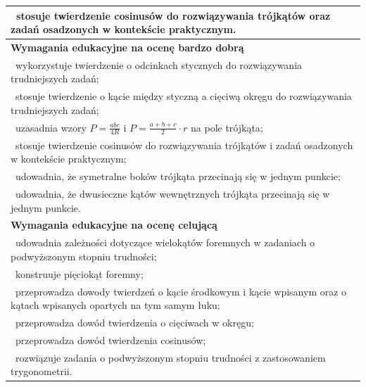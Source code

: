 \documentclass[12pt,a4paper]{article}
\begin{document}
\begin{longtable}{|p{16cm}|}
		\textbullet\ stosuje twierdzenie cosinusów do rozwiązywania trójkątów oraz zadań osadzonych w kontekście praktycznym. \\ \hline
		
		\textbf{Wymagania edukacyjne na ocenę bardzo dobrą} \\ \hline
		
		\textbullet\ wykorzystuje twierdzenie o odcinkach stycznych do rozwiązywania trudniejszych zadań; \\
		
		\textbullet\ stosuje twierdzenie o kącie między styczną a cięciwą okręgu do rozwiązywania trudniejszych zadań; \\
		
		\textbullet\ uzasadnia wzory $P=\frac{abc}{4R}$ i $P=\frac{a+b+c}{2}\cdot r$ na pole trójkąta; \\
		
		\textbullet\ stosuje twierdzenie cosinusów do rozwiązywania trójkątów i zadań osadzonych w kontekście praktycznym; \\
		
		\textbullet\ udowadnia, że symetralne boków trójkąta przecinają się w jednym punkcie; \\
		
		\textbullet\ udowadnia, że dwusieczne kątów wewnętrznych trójkąta przecinają się w jednym punkcie. \\ \hline
		
		\textbf{Wymagania edukacyjne na ocenę celującą} \\ \hline
		
		\textbullet\ udowadnia zależności dotyczące wielokątów foremnych w zadaniach o podwyższonym stopniu trudności; \\
		
		\textbullet\ konstruuje pięciokąt foremny; \\
		
		\textbullet\ przeprowadza dowody twierdzeń o kącie środkowym i kącie wpisanym oraz o kątach wpisanych opartych na tym samym łuku; \\
		
		\textbullet\ przeprowadza dowód twierdzenia o cięciwach w okręgu; \\
		
		\textbullet\ przeprowadza dowód twierdzenia cosinusów; \\
		
		\textbullet\ rozwiązuje zadania o podwyższonym stopniu trudności z zastosowaniem trygonometrii. \\ \hline
		
	\end{longtable}
	
\end{document}

